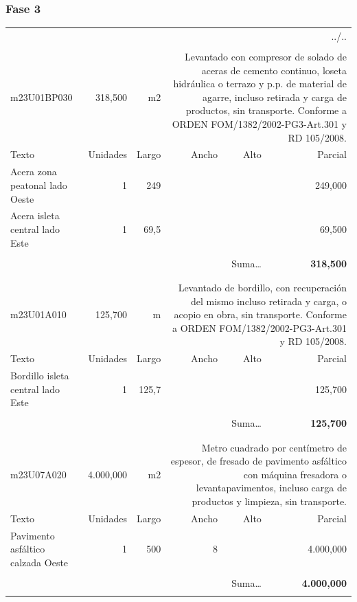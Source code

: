 \documentclass{book}%
\begin{document}
\subsubsection{Fase 3}%
\begin{longtable}{lrrrrr}%
\multicolumn{6}{r}{../..}\\%
\endfoot%
\endlastfoot%
&&&&&\\%
m23U01BP030&   318,500& m2&\multicolumn{3}{p{6cm}}{\scriptsize Levantado con compresor de solado de aceras de cemento continuo, loseta hidráulica o terrazo y p.p. de material de agarre, incluso retirada y carga de productos, sin transporte. Conforme a ORDEN FOM/1382/2002-PG3-Art.301 y RD 105/2008.\normalsize}\\%
Texto&Unidades&Largo&Ancho&Alto&Parcial\\%
\hline%
\multicolumn{1}{p{3.5cm}}{Acera  zona peatonal lado Oeste}&1&249&&&   249,000\\%
\multicolumn{1}{p{3.5cm}}{Acera  isleta central lado Este}&1&69,5&&&    69,500\\%
&&&&&\\%
\multicolumn{5}{r}{Suma\ldots}&\textbf{   318,500}\\%
\hline%
&&&&&\\%
&&&&&\\%
m23U01A010&   125,700& m&\multicolumn{3}{p{6cm}}{\scriptsize Levantado de bordillo, con recuperación del mismo incluso retirada y carga, o acopio en obra, sin transporte. Conforme a ORDEN FOM/1382/2002-PG3-Art.301 y RD 105/2008.\normalsize}\\%
Texto&Unidades&Largo&Ancho&Alto&Parcial\\%
\hline%
\multicolumn{1}{p{3.5cm}}{Bordillo  isleta central lado Este}&1&125,7&&&   125,700\\%
&&&&&\\%
\multicolumn{5}{r}{Suma\ldots}&\textbf{   125,700}\\%
\hline%
&&&&&\\%
&&&&&\\%
m23U07A020& 4.000,000& m2&\multicolumn{3}{p{6cm}}{\scriptsize Metro cuadrado por centímetro de espesor, de fresado de pavimento asfáltico con máquina fresadora o levantapavimentos, incluso carga de productos y limpieza, sin transporte.\normalsize}\\%
Texto&Unidades&Largo&Ancho&Alto&Parcial\\%
\hline%
\multicolumn{1}{p{3.5cm}}{Pavimento asfáltico calzada Oeste}&1&500&8&& 4.000,000\\%
&&&&&\\%
\multicolumn{5}{r}{Suma\ldots}&\textbf{ 4.000,000}\\%
\hline%
&&&&&\\%
\end{longtable}%
\newpage
\end{document}
